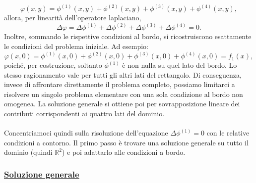 \documentclass[a4paper,12pt]{report}
\begin{document}
\[
\varphi(x,y)=\phi^{(1)}(x,y)+\phi^{(2)}(x,y)+\phi^{(3)}(x,y)+\phi^{(4)}(x,y),
\]
allora, per linearità dell’operatore laplaciano,
\[
\Delta\varphi
=
\Delta\phi^{(1)}
+
\Delta\phi^{(2)}
+
\Delta\phi^{(3)}
+
\Delta\phi^{(4)}
=
0.
\]
Inoltre, sommando le rispettive condizioni al bordo, si ricostruiscono esattamente le condizioni del problema iniziale. Ad esempio:
\[
\varphi(x,0)
=
\phi^{(1)}(x,0)
+
\phi^{(2)}(x,0)
+
\phi^{(3)}(x,0)
+
\phi^{(4)}(x,0)
=
f_1(x),
\]
poiché, per costruzione, soltanto \(\phi^{(1)}\) è non nulla su quel lato del bordo. Lo stesso ragionamento vale per tutti gli altri lati del rettangolo. Di conseguenza, invece di affrontare direttamente il problema completo, possiamo limitarci a risolvere un singolo problema elementare con una sola condizione al bordo non omogenea. La soluzione generale si ottiene poi per sovrapposizione lineare dei contributi corrispondenti ai quattro lati del dominio.
\\
\\ Concentriamoci quindi sulla risoluzione dell'equazione $\Delta\phi^{(1)}=0$ con le relative condizioni a contorno. Il primo passo è trovare una soluzione generale su tutto il dominio (quindi $\mathbb{R}^2$) e poi adattarlo alle condizioni a bordo.

\newpage

\subsubsection{\underline{Soluzione generale}}
\end{document}
